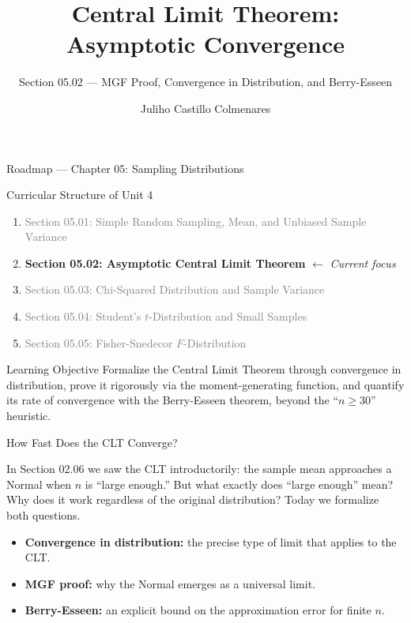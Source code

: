 \documentclass[aspectratio=169,xcolor={dvipsnames,table}]{beamer}
\title{Central Limit Theorem: Asymptotic Convergence}
\subtitle{Section 05.02 --- MGF Proof, Convergence in Distribution, and Berry-Esseen}
\author[J. Castillo Colmenares]{Juliho Castillo Colmenares}
\institute[Tec de Monterrey]{Tecnologico de Monterrey}
\date{\vspace{-1.5cm}}
\begin{document}
\begin{frame}[plain]
	\titlepage
\end{frame}

\begin{frame}{Roadmap --- Chapter 05: Sampling Distributions}
	\vspace{-0.15cm}
	\begin{block}{Curricular Structure of Unit 4}
		\footnotesize
		\begin{enumerate}\itemsep=0.03cm
			\item \textcolor{gray}{Section 05.01: Simple Random Sampling, Mean, and Unbiased Sample Variance}
			\item \textbf{\textcolor{TecRojo}{Section 05.02: Asymptotic Central Limit Theorem}} $\leftarrow$ \emph{Current focus}
			\item \textcolor{gray}{Section 05.03: Chi-Squared Distribution and Sample Variance}
			\item \textcolor{gray}{Section 05.04: Student's $t$-Distribution and Small Samples}
			\item \textcolor{gray}{Section 05.05: Fisher-Snedecor $F$-Distribution}
		\end{enumerate}
	\end{block}
	\vspace{-0.2cm}
	\begin{alertblock}{Learning Objective}
		\scriptsize
		Formalize the Central Limit Theorem through convergence in distribution, prove it rigorously via the moment-generating function, and quantify its rate of convergence with the Berry-Esseen theorem, beyond the ``$n\ge30$'' heuristic.
	\end{alertblock}
\end{frame}

\begin{frame}{How Fast Does the CLT Converge?}
	\footnotesize
	\begin{motivacion}
		In Section 02.06 we saw the CLT introductorily: the sample mean approaches a Normal when $n$ is ``large enough.'' But what exactly does ``large enough'' mean? Why does it work regardless of the original distribution? Today we formalize both questions.
	\end{motivacion}
	\vspace{0.15cm}
	\pause
	\begin{itemize}\itemsep=0.1cm
		\item \textbf{Convergence in distribution:} the precise type of limit that applies to the CLT. \pause
		\item \textbf{MGF proof:} why the Normal emerges as a universal limit. \pause
		\item \textbf{Berry-Esseen:} an explicit bound on the approximation error for finite $n$.
	\end{itemize}
\end{frame}
\end{document}
